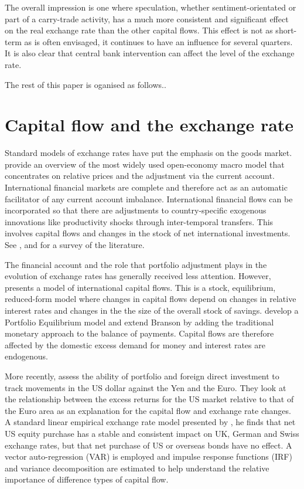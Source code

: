 \documentclass[12pt, a4paper, oneside]{article}\usepackage[]{graphicx}\usepackage[]{color}
\begin{document}
The overall impression is one where speculation, whether sentiment-orientated or part of a carry-trade activity, has a much more consistent and significant effect on the real exchange rate than the other capital flows.  This effect is not as short-term as is often envisaged, it continues to have an influence for several quarters. It is also clear that central bank intervention can affect the level of the exchange rate. 

The rest of this paper is oganised as follows..

\section{Capital flow and the exchange rate}
Standard models of exchange rates have put the emphasis on the goods market. \citet{OandR} provide an overview of the most widely used open-economy macro model that concentrates on relative prices and the adjustment via the current account.  International financial markets are complete and therefore act as an automatic facilitator of any current account imbalance.  International financial flows can be incorporated so that there are adjustments to country-specific exogenous innovations like productivity shocks through inter-temporal transfers.  This involves capital flows and changes in the stock of net international investments. See \citet{obstfeld2000new}, \citet{OandRedux} and \citet{lane2001new} for a survey of the literature. 

The financial account and the role that portfolio adjustment plays in the evolution of exchange rates has generally received less attention.  However, \citet{Branson1971} presents a model of international capital flows. This is a stock, equilibrium, reduced-form model where changes in capital flows depend on changes in relative interest rates and changes in the the size of the overall stock of savings.  \citet{Kouri1974International} develop a Portfolio Equilibrium model and extend Branson by adding the traditional monetary approach to the balance of payments. Capital flows are therefore affected by the domestic excess demand for money and interest rates are endogenous.   
  
More recently, \citet{brookscapital} assess the ability of portfolio and foreign direct investment to track movements in the US dollar against the Yen and the Euro. They look at the relationship between the excess returns for the US market relative to that of the Euro area as an explanation for the capital flow and exchange rate changes. A standard linear empirical exchange rate model presented by \citet{Siourounis2004Capital}, he finds that net US equity purchase has a stable and consistent impact on UK, German and Swiss exchange rates, but that net purchase of US or overseas bonds have no effect.   A vector auto-regression (VAR) is employed and impulse response functions (IRF) and variance decomposition are estimated to help understand the relative importance of difference types of capital flow.  
  
\end{document}
